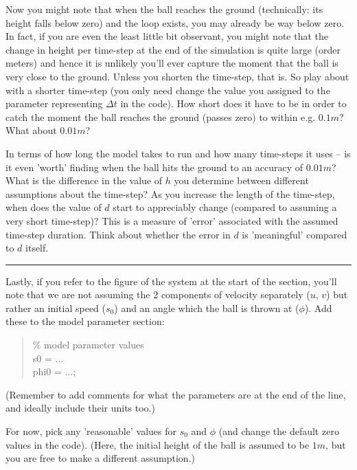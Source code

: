 \documentclass{tufte-book} %
\newenvironment{docspec}{\begin{quotation}\ttfamily\parskip0pt\parindent0pt\ignorespaces}{\end{quotation}}
\begin{document}
Now you might note that when the ball reaches the ground (technically: its height falls below zero) and the loop exists, you may already be way below zero. In fact, if you are even the least little bit observant, you might note that the change in height per time-step at the end of the simulation is quite large (order meters) and hence it is unlikely you'll ever capture the moment that the ball is very close to the ground. Unless you shorten the time-step, that is. So play about with a shorter time-step (you only need change the value you assigned to the parameter representing \(\Delta t\) in the code). How short does it have to be in order to catch the moment the ball reaches the ground (passes zero) to within e.g. \(0.1 m\)? What about \(0.01 m\)? 

In terms of how long the model takes to run and how many time-steps it uses -- is it even 'worth' finding when the ball hits the ground to an accuracy of \(0.01 m\)? What is the difference in the value of \(h\) you determine between different assumptions about the time-step? As you increase the length of the time-step, when does the value of \(d\) start to appreciably change (compared to assuming a very short time-step)? This is a measure of 'error' associated with the assumed time-step duration. Think about whether the error in \(d\) is 'meaningful' compared to \(d\) itself.

\vspace{1mm}
\noindent\rule{4cm}{0.5pt}
\vspace{2mm}

\noindent Lastly, if you refer to the figure of the system at the start of the section, you'll note that we are not assuming the 2 components of velocity separately (\(u\), \(v\)) but rather an initial speed (\(s_{0}\)) and an angle which the ball is thrown at (\(\phi\)). Add these to the model parameter section: 
\begin{docspec}
\textcolor[rgb]{0,0.501961,0}{\% model parameter values}\\
s0 = ...\\
phi0 = ...;
\end{docspec}
(Remember to add comments for what the parameters are at the end of the line, and ideally include their units too.)

For now, pick any 'reasonable' values for \(s_{0}\)  and \(\phi\)  (and change the default zero values in the code). (Here, the initial height of the ball is assumed to be \(1m\), but you are free to make a different assumption.)
\end{document}
